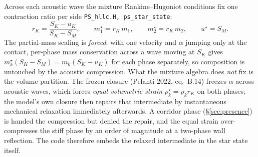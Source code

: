 \documentclass[11pt,a4paper]{article}
\newcommand{\code}[1]{\texttt{\small #1}}
\newcommand{\src}[1]{{\color{gray}\code{#1}}}
\begin{document}
Across each acoustic wave the mixture Rankine--Hugoniot conditions fix one
contraction ratio per side \src{PS\_hllc.H, ps\_star\_state}:
\begin{equation}
  r_K = \frac{S_K-u_K}{S_K-S_M},
  \qquad
  m_1^\star = r_K\,m_1,
  \qquad
  m_2^\star = r_K\,m_2 ,
  \qquad
  u^\star = S_M .
  \label{eq:rk}
\end{equation}
The partial-mass scaling is \emph{forced}: with one velocity and $\alpha$
jumping only at the contact, per-phase mass conservation across a wave moving
at $S_K$ gives $m_k^\star(S_K-S_M)=m_k(S_K-u_K)$ for each phase separately,
so composition is untouched by the acoustic compression.  What the mixture
algebra does \emph{not} fix is the volume partition.  The frozen closure
(Pelanti 2022, eq.~B.14) freezes $\alpha$ across acoustic waves, which forces
\emph{equal volumetric strain} $\rho_k^\star=\rho_k r_K$ on both phases; the
model's own closure then repairs that intermediate by instantaneous mechanical
relaxation immediately afterwards.  A corridor phase (\S\ref{sec:presence}) is
handed the compression but denied the repair, and the equal strain
over-compresses the stiff phase by an order of magnitude at a two-phase wall
reflection.  The code therefore embeds the relaxed intermediate in the star
state itself.
\end{document}
